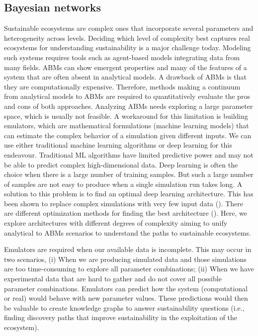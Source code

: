 \documentclass[12pt,a4paper]{article}
\begin{document}
\subsection{Bayesian networks}
Sustainable ecosystems are complex ones that incorporate several parameters and heterogeneity across levels. Deciding which level of complexity best captures real ecosystems for understanding sustainability is a major challenge today. Modeling such systems requires tools such as agent-based models integrating data from many fields. ABMs can show emergent properties and many of the features of a system that are often absent in analytical models. A drawback of ABMs is that they are computationally expensive. Therefore, methods making a continuum from analytical models to ABMs are required to quantitatively evaluate the pros and cons of both approaches. Analyzing ABMs needs exploring a large parameter space, which is usually not feasible. A workaround for this limitation is building emulators, which are mathematical formulations (machine learning models) that can estimate the complex behavior of a simulation given different inputs. We can use either traditional machine learning algorithms or deep learning for this endeavour. Traditional ML algorithms have limited predictive power and may not be able to predict complex high-dimensional data. Deep learning is often the choice when there is a large number of training samples. But such a large number of samples are not easy to produce when a single simulation run takes long. A solution to this problem is to find an optimal deep learning architecture. This has been shown to replace complex simulations with very few input data (\cite{Kasim2020}). There are different optimization methods for finding the best architecture (\cite{Elsken2018}). Here, we explore architectures with different degrees of complexity aiming to unify analytical to ABMs scenarios to understand the paths to sustainable ecosystems. 


Emulators are required when our available data is incomplete. This may occur in two scenarios, (i) When we are producing simulated data and those simulations are too time-consuming to explore all parameter combinations; (ii) When we have experimental data that are hard to gather and do not cover all possible parameter combinations. Emulators can predict how the system (computational or real) would behave with new parameter values. These predictions would then be valuable to create knowledge graphs to answer sustainability questions (i.e., finding discovery paths that improve sustainability in the exploitation of the ecosystem).
\end{document}
